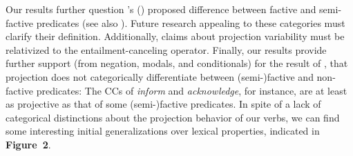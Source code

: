 \documentclass[12pt, a4paper]{article}
\newcommand{\posscite}[1]{\citeauthor{#1}'s (\citeyear{#1})}
\begin{document}
	Our results further question \posscite{karttunen_observations_1971} proposed difference between factive and semi-factive predicates (see also \citealt{beaver_have_2010}).
	Future research appealing to these categories must clarify their definition. Additionally, claims about projection variability must be relativized to the entailment-canceling operator.
	Finally, our results provide further support (from negation, modals, and conditionals) for the result of \citet{degen_are_2022}, that projection does not categorically differentiate between (semi-)factive and non-factive predicates: The CCs of \emph{inform} and \emph{acknowledge}, for instance, are at least as projective as that of some (semi-)factive predicates.
	In spite of a lack of categorical distinctions about the projection behavior of our verbs, we can find some interesting initial generalizations over lexical properties, indicated in \textbf{Figure\ 2}.
	

\end{document}
